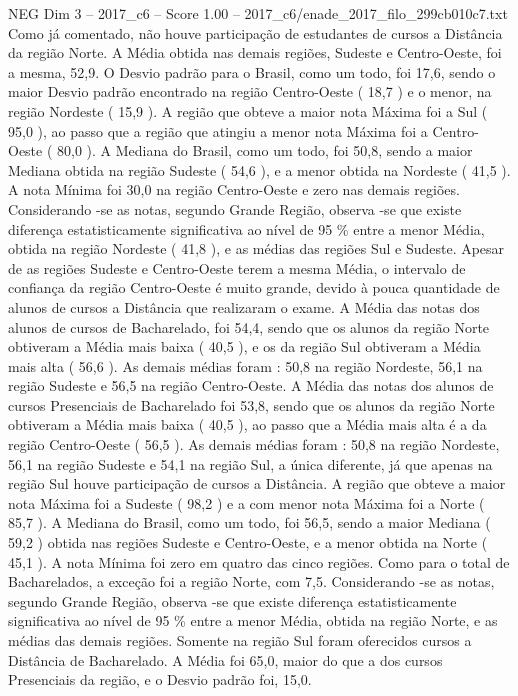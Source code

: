 \begin{textsample}{NEG Dim 3 – 2017\_c6 – Score 1.00 – 2017\_c6/enade\_2017\_filo\_299cb010c7.txt}
Como já comentado, não houve participação de estudantes de cursos a Distância da região Norte.
A Média obtida nas demais regiões, Sudeste e Centro-Oeste, foi a mesma, 52,9.
O Desvio padrão para o Brasil, como um todo, foi 17,6, sendo o maior Desvio padrão encontrado na região Centro-Oeste ( 18,7 ) e o menor, na região Nordeste ( 15,9 ).
A região que obteve a maior nota Máxima foi a Sul ( 95,0 ), ao passo que a região que atingiu a menor nota Máxima foi a Centro-Oeste ( 80,0 ).
A Mediana do Brasil, como um todo, foi 50,8, sendo a maior Mediana obtida na região Sudeste ( 54,6 ), e a menor obtida na Nordeste ( 41,5 ).
A nota Mínima foi 30,0 na região Centro-Oeste e zero nas demais regiões.
Considerando -se as notas, segundo Grande Região, observa -se que existe diferença estatisticamente significativa ao nível de 95 \% entre a menor Média, obtida na região Nordeste ( 41,8 ), e as médias das regiões Sul e Sudeste.
Apesar de as regiões Sudeste e Centro-Oeste terem a mesma Média, o intervalo de confiança da região Centro-Oeste é muito grande, devido à pouca quantidade de alunos de cursos a Distância que realizaram o exame.
A Média das notas dos alunos de cursos de Bacharelado, foi 54,4, sendo que os alunos da região Norte obtiveram a Média mais baixa ( 40,5 ), e os da região Sul obtiveram a Média mais alta ( 56,6 ).
As demais médias foram : 50,8 na região Nordeste, 56,1 na região Sudeste e 56,5 na região Centro-Oeste.
A Média das notas dos alunos de cursos Presenciais de Bacharelado foi 53,8, sendo que os alunos da região Norte obtiveram a Média mais baixa ( 40,5 ), ao passo que a Média mais alta é a da região Centro-Oeste ( 56,5 ).
As demais médias foram : 50,8 na região Nordeste, 56,1 na região Sudeste e 54,1 na região Sul, a única diferente, já que apenas na região Sul houve participação de cursos a Distância.
A região que obteve a maior nota Máxima foi a Sudeste ( 98,2 ) e a com menor nota Máxima foi a Norte ( 85,7 ).
A Mediana do Brasil, como um todo, foi 56,5, sendo a maior Mediana ( 59,2 ) obtida nas regiões Sudeste e Centro-Oeste, e a menor obtida na Norte ( 45,1 ).
A nota Mínima foi zero em quatro das cinco regiões.
Como para o total de Bacharelados, a exceção foi a região Norte, com 7,5.
Considerando -se as notas, segundo Grande Região, observa -se que existe diferença estatisticamente significativa ao nível de 95 \% entre a menor Média, obtida na região Norte, e as médias das demais regiões.
Somente na região Sul foram oferecidos cursos a Distância de Bacharelado.
A Média foi 65,0, maior do que a dos cursos Presenciais da região, e o Desvio padrão foi, 15,0.

\end{textsample}

